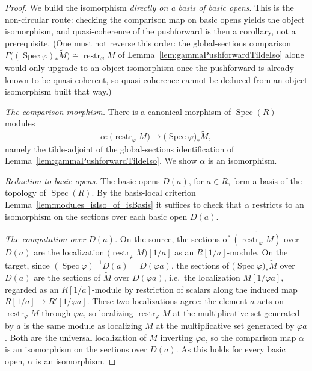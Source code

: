 \begin{proof}
  We build the isomorphism \emph{directly on a basis of basic opens}. This is the
  non-circular route: checking the comparison map on basic opens yields the object
  isomorphism, and quasi-coherence of the pushforward is then a corollary, not a
  prerequisite. (One must not reverse this order: the global-sections comparison
  \(\Gamma\bigl((\operatorname{Spec}\varphi)_*\widetilde{M}\bigr) \cong
  \operatorname{restr}_\varphi M\) of
  Lemma~\ref{lem:gammaPushforwardTildeIso} alone would only upgrade to an object
  isomorphism once the pushforward is already known to be quasi-coherent, so
  quasi-coherence cannot be deduced from an object isomorphism built that way.)

  \emph{The comparison morphism.} There is a canonical morphism of
  \(\operatorname{Spec}(R)\)-modules
  \[
    \alpha : \widetilde{\bigl(\operatorname{restr}_\varphi M\bigr)}
    \longrightarrow \bigl(\operatorname{Spec}\varphi\bigr)_*\widetilde{M},
  \]
  namely the tilde-adjoint of the global-sections identification of
  Lemma~\ref{lem:gammaPushforwardTildeIso}. We show \(\alpha\) is an isomorphism.

  \medskip
  \emph{Reduction to basic opens.} The basic opens \(D(a)\), for \(a \in R\), form a
  basis of the topology of \(\operatorname{Spec}(R)\). By the basis-local criterion
  Lemma~\ref{lem:modules_isIso_of_isBasis} it suffices to check that \(\alpha\)
  restricts to an isomorphism on the sections over each basic open \(D(a)\).

  \medskip
  \emph{The computation over \(D(a)\).} On the source, the sections of
  \(\widetilde{(\operatorname{restr}_\varphi M)}\) over \(D(a)\) are the
  localization \(\bigl(\operatorname{restr}_\varphi M\bigr)[1/a]\) as an
  \(R[1/a]\)-module. On the target, since \((\operatorname{Spec}\varphi)^{-1}D(a) =
  D(\varphi a)\), the sections of \(\bigl(\operatorname{Spec}\varphi\bigr)_*
  \widetilde{M}\) over \(D(a)\) are the sections of \(\widetilde{M}\) over
  \(D(\varphi a)\), i.e.\ the localization \(M[1/\varphi a]\), regarded as an
  \(R[1/a]\)-module by restriction of scalars along the induced map
  \(R[1/a] \to R'[1/\varphi a]\). These two localizations agree: the element \(a\)
  acts on \(\operatorname{restr}_\varphi M\) through \(\varphi a\), so localizing
  \(\operatorname{restr}_\varphi M\) at the multiplicative set generated by \(a\) is
  the same module as localizing \(M\) at the multiplicative set generated by
  \(\varphi a\). Both are the universal localization of
  \(M\) inverting \(\varphi a\), so the comparison map \(\alpha\) is an isomorphism
  on the sections over \(D(a)\). As this holds for every basic open, \(\alpha\) is
  an isomorphism.


\end{proof}
